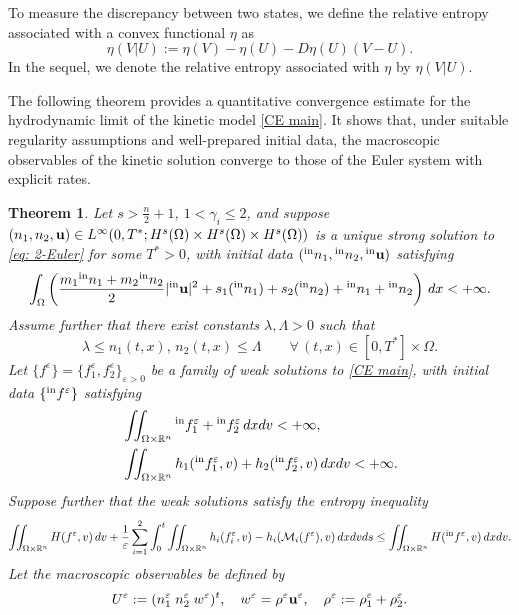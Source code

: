 \documentclass[10pt,reqno]{amsart}
\numberwithin{equation}{section}
\newtheorem{theorem}{Theorem}[section]
\newcommand{\R}{\mathbb R}
\newcommand{\bq}{\begin{equation}}
\newcommand{\eq}{\end{equation}}
\newcommand{\calM}{\mathcal M}
\newcommand{\ve}{\varepsilon}
\begin{document}
To measure the discrepancy between two states, we define the relative entropy associated with a convex functional $\eta$ as
\[
    \eta(V|U) := \eta(V) - \eta(U) - D\eta(U)(V-U).
\]
In the sequel, we denote the relative entropy associated with $\eta$ by $\eta(V|U)$. 

The following theorem provides a quantitative convergence estimate for the hydrodynamic limit of the kinetic model \eqref{CE main}. It shows that, under suitable regularity assumptions and well-prepared initial data, the macroscopic observables of the kinetic solution converge to those of the Euler system with explicit rates.
\begin{theorem}\label{thm: relent}
    Let $s>\frac n2 + 1$, $1 < \gamma_i \leq 2$, and suppose $(n_1,n_2,{\bf{u}})\in L^\infty(0,T^*;H^s(\Omega)\times H^s(\Omega)\times H^s(\Omega))$ is a unique strong solution to \eqref{eq: 2-Euler} for some $T^*>0$, with initial data $({}^{\rm in}n_1, {}^{\rm in}n_2, {}^{\rm in}{\bf{u}})$ satisfying
    \begin{align*}
        \int_\Omega \left(\frac{m_1 {}^{\rm in}n_1 + m_2{}^{\rm in}n_2}{2} |{}^{\rm in}{\bf{u}}|^2 + s_1({}^{\rm in}n_1) + s_2({}^{\rm in}n_2) + {}^{\rm in}n_1 + {}^{\rm in}n_2 \right)\,dx < +\infty.
    \end{align*}
    Assume further that there exist constants $\lambda,\Lambda>0$  such that
\bq\label{bdd_rho}
        \lambda \le n_1(t,x), \,n_2(t,x) \le \Lambda \qquad \forall \, (t,x)\in [0,T^*]\times \Omega.
\eq
    Let $\{f^\ve\} = \{f_1^\ve, f_2^\ve\}_{\ve>0}$ be a family of weak solutions to \eqref{CE main}, with initial data $\{{}^{\rm in}f^{\ve}\}$ satisfying
    \begin{align*}
        &\iint_{\Omega \times \R^n} {}^{\rm in}f^\ve_1 + {}^{\rm in}f_2^\ve\,dxdv < +\infty, \\
        &\iint_{\Omega \times \R^n} h_1({}^{\rm in}f_1^\ve,v) + h_2({}^{\rm in}f_2^\ve,v)\, dxdv < +\infty.
    \end{align*}
Suppose further that the weak solutions satisfy the entropy inequality
    \begin{align*}
        \iint_{\Omega \times \R^n} H(f^\ve,v)\,dv + \frac{1}{\ve} \sum_{i=1}^2 \int_0^t \iint_{\Omega \times \R^n} h_i(f_i^\ve,v) - h_i(\calM_i(f^\ve),v)\,dxdvds \le \iint_{\Omega \times \R^n} H({}^{\rm in}f^\ve,v)\,dxdv.
    \end{align*}
Let the macroscopic observables be defined by    
\[
U^\ve := (n_1^\ve\; n_2^\ve\; w^\ve)^t, \quad w^\ve = \rho^\ve {\bf{u}}^\ve, \quad \rho^\ve:= \rho_1^\ve + \rho_2^\ve.
\]
\end{theorem}
\end{document}
